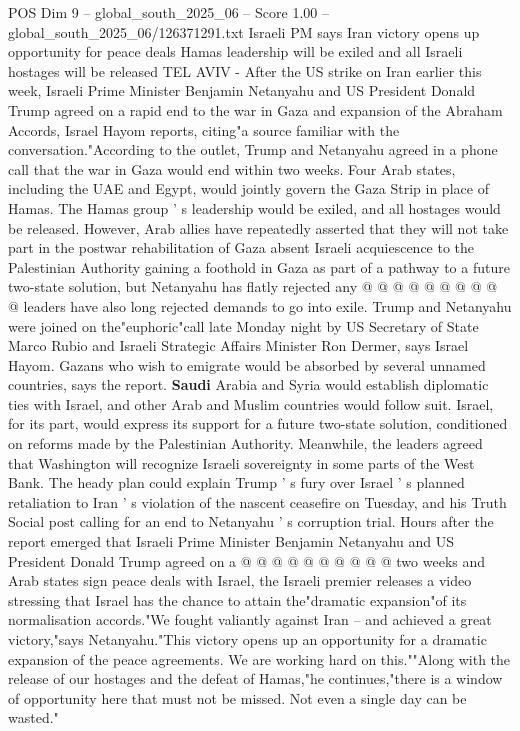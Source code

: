 \begin{textsample}{POS Dim 9 – global\_south\_2025\_06 – Score 1.00 – global\_south\_2025\_06/126371291.txt}  \label{ex:f9_pos_188}
Israeli PM says Iran victory opens up opportunity for peace deals Hamas leadership will be exiled and all Israeli hostages will be released TEL AVIV - After the US strike on Iran earlier this week, Israeli Prime Minister Benjamin Netanyahu and US President Donald Trump agreed on a rapid end to the war in Gaza and expansion of the Abraham Accords, Israel Hayom reports, citing"a source familiar with the conversation."According to the outlet, Trump and Netanyahu agreed in a phone call that the war in Gaza would end within two weeks.
Four Arab states, including the UAE and Egypt, would jointly govern the Gaza Strip in place of Hamas.
The Hamas group ' s leadership would be exiled, and all hostages would be released.
However, Arab allies have repeatedly asserted that they will not take part in the postwar rehabilitation of Gaza absent Israeli acquiescence to the Palestinian Authority gaining a foothold in Gaza as part of a pathway to a future two-state solution, but Netanyahu has flatly rejected any @ @ @ @ @ @ @ @ @ @ leaders have also long rejected demands to go into exile.
Trump and Netanyahu were joined on the"euphoric"call late Monday night by US Secretary of State Marco Rubio and Israeli Strategic Affairs Minister Ron Dermer, says Israel Hayom.
Gazans who wish to emigrate would be absorbed by several unnamed countries, says the report. \textbf{Saudi} Arabia and Syria would establish diplomatic ties with Israel, and other Arab and Muslim countries would follow suit.
Israel, for its part, would express its support for a future two-state solution, conditioned on reforms made by the Palestinian Authority.
Meanwhile, the leaders agreed that Washington will recognize Israeli sovereignty in some parts of the West Bank.
The heady plan could explain Trump ' s fury over Israel ' s planned retaliation to Iran ' s violation of the nascent ceasefire on Tuesday, and his Truth Social post calling for an end to Netanyahu ' s corruption trial.
Hours after the report emerged that Israeli Prime Minister Benjamin Netanyahu and US President Donald Trump agreed on a @ @ @ @ @ @ @ @ @ @ two weeks and Arab states sign peace deals with Israel, the Israeli premier releases a video stressing that Israel has the chance to attain the"dramatic expansion"of its normalisation accords."We fought valiantly against Iran -- and achieved a great victory,"says Netanyahu."This victory opens up an opportunity for a dramatic expansion of the peace agreements.
We are working hard on this.""Along with the release of our hostages and the defeat of Hamas,"he continues,"there is a window of opportunity here that must not be missed.
Not even a single day can be wasted."

\end{textsample}
